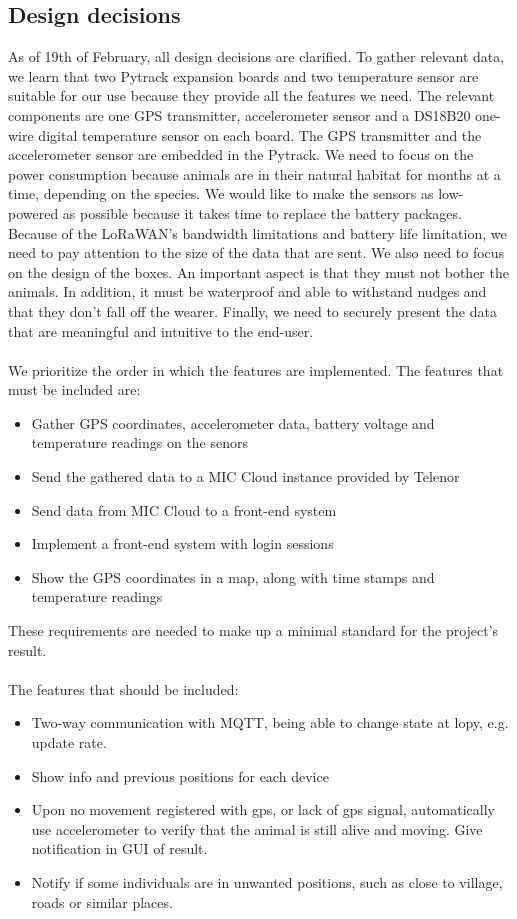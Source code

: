 	\subsection{Design decisions}
		As of 19th of February, all design decisions are clarified. To gather relevant data, we learn that two Pytrack expansion boards and two temperature sensor are suitable for our use because they provide all the features we need. The relevant components are one GPS transmitter, accelerometer sensor and a DS18B20 one-wire digital temperature sensor on each board. The GPS transmitter and the accelerometer sensor are embedded in the Pytrack. We need to focus on the power consumption because animals are in their natural habitat for months at a time, depending on the species. We would like to make the sensors as low-powered as possible because it takes time to replace the battery packages. Because of the LoRaWAN’s bandwidth limitations and battery life limitation, we need to pay attention to the size of the data that are sent. We also need to focus on the design of the boxes. An important aspect is that they must not bother the animals. In addition, it must be waterproof and able to withstand nudges and that they don't fall off the wearer. Finally, we need to securely present the data that are meaningful and intuitive to the end-user.
		\\\\
		We prioritize the order in which the features are implemented. The features that must be included are:
		\begin{itemize}  
			\item Gather GPS coordinates, accelerometer data, battery voltage and temperature readings on the senors
			\item Send the gathered data to a MIC Cloud instance provided by Telenor
			\item Send data from MIC Cloud to a front-end system
			\item Implement a front-end system with login sessions
			\item Show the GPS coordinates in a map, along with time stamps and temperature readings
		\end{itemize}
		These requirements are needed to make up a minimal standard for the project's result. 
		\\\\
		The features that should be included:
		\begin{itemize}  
			\item Two-way communication with MQTT, being able to change state at lopy, e.g. update rate. 
			\item Show info and previous positions for each device
			\item Upon no movement registered with gps, or lack of gps signal, automatically use accelerometer to verify that the animal is still alive and moving. Give notification in GUI of result. 
			\item Notify if some individuals are in unwanted positions, such as close to village, roads or similar places.
			
		\end{itemize}
